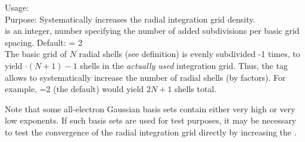 {
  Usage:   \\[1.0ex]
  Purpose: Systematically increases the radial integration grid
  density. \\[1.0ex]
   is an integer, number specifying the number of
    added subdivisions per basic grid spacing. Default: 
    = 2 \\
}
The basic grid of $N$ radial shells (see
 definition) is evenly subdivided
-1 times, to yield $\cdot (N+1) - 1$
shells in the \emph{actually used} integration grid. Thus, the
 tag allows to systematically
increase the number of radial shells (by factors). For example,
=2 (the default) would yield $2N+1$ shells total.

Note that some all-electron Gaussian basis sets contain either very
high or very low exponents. If such basis sets are used for test
purposes, it may be necessary to test the convergence of the radial
integration grid directly by increasing the
. 
